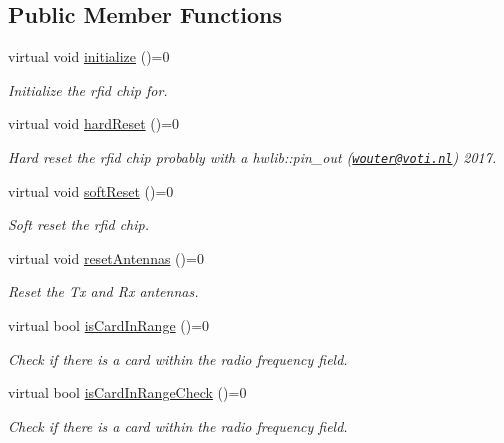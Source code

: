 \subsection*{Public Member Functions}
\begin{DoxyCompactItemize}
\item 
virtual void \mbox{\hyperlink{classrfid_a76f857b77fbea6776048aab6ba835a29}{initialize}} ()=0
\begin{DoxyCompactList}\small\item\em Initialize the rfid chip for. \end{DoxyCompactList}\item 
virtual void \mbox{\hyperlink{classrfid_a7f993197e5aa12e7b3bfb1576552bbf1}{hard\+Reset}} ()=0
\begin{DoxyCompactList}\small\item\em Hard reset the rfid chip probably with a hwlib\+::pin\+\_\+out (\href{mailto:wouter@voti.nl}{\tt wouter@voti.\+nl}) 2017. \end{DoxyCompactList}\item 
\mbox{\label{classrfid_a880add72f6db49af0b1d23878308d733}} 
virtual void \mbox{\hyperlink{classrfid_a880add72f6db49af0b1d23878308d733}{soft\+Reset}} ()=0
\begin{DoxyCompactList}\small\item\em Soft reset the rfid chip. \end{DoxyCompactList}\item 
virtual void \mbox{\hyperlink{classrfid_abf4826e77ab7b02f04c8f01d969149c1}{reset\+Antennas}} ()=0
\begin{DoxyCompactList}\small\item\em Reset the Tx and Rx antennas. \end{DoxyCompactList}\item 
virtual bool \mbox{\hyperlink{classrfid_a23fc4ec0bc3790c5e68269d4f32771b9}{is\+Card\+In\+Range}} ()=0
\begin{DoxyCompactList}\small\item\em Check if there is a card within the radio frequency field. \end{DoxyCompactList}\item 
virtual bool \mbox{\hyperlink{classrfid_a9790d273f2385c8fb48bb85ca2aa0d10}{is\+Card\+In\+Range\+Check}} ()=0
\begin{DoxyCompactList}\small\item\em Check if there is a card within the radio frequency field. \end{DoxyCompactList}\item 

\end{DoxyCompactItemize}
